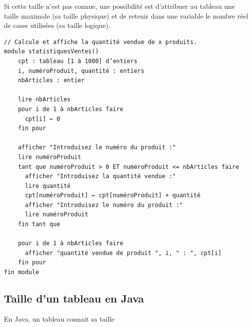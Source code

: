 \documentclass[11pt,a4paper]{article}
\begin{document}
            \par
        
		    Si cette taille n'est pas connue, une possibilit\'e est
        d'attribuer au tableau une taille maximale (sa taille physique) et de retenir dans une
        variable le nombre r\'eel de cases utilis\'ees (sa taille logique).
		  
            \par
        \begin{verbatim}
// Calcule et affiche la quantité vendue de x produits.
module statistiquesVentes()
    cpt : tableau [1 à 1000] d’entiers
    i, numéroProduit, quantité : entiers
    nbArticles : entier
    
    lire nbArticles
    pour i de 1 à nbArticles faire
      cpt[i] ← 0
    fin pour
    
    afficher "Introduisez le numéro du produit :"
    lire numéroProduit
    tant que numéroProduit > 0 ET numéroProduit <= nbArticles faire
      afficher "Introduisez la quantité vendue :"
      lire quantité
      cpt[numéroProduit] ← cpt[numéroProduit] + quantité
      afficher "Introduisez le numéro du produit :"
      lire numéroProduit
    fin tant que
    
    pour i de 1 à nbArticles faire
      afficher "quantité vendue de produit ", i, " : ", cpt[i]
    fin pour
fin module
\end{verbatim}\subsection{Taille d'un tableau en Java}
		    En Java, un tableau connait sa taille
      
\end{document}
